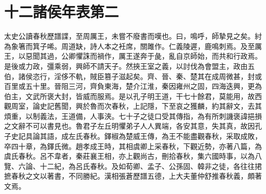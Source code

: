 \chapter{十二諸侯年表第二}

太史公讀春秋歷譜諜，至周厲王，未嘗不廢書而嘆也。曰，鳴呼，師摯見之矣。紂為象箸而箕子唏。周道缺，詩人本之衽席，關雎作。仁義陵遲，鹿鳴刺焉。及至厲王，以惡聞其過，公卿懼誅而禍作，厲王遂奔于彘，亂自京師始，而共和行政焉。是後或力政，彊乘弱，興師不請天子。然挾王室之義，以討伐為會盟主，政由五伯，諸侯恣行，淫侈不軌，賊臣篡子滋起矣。齊、晉、秦、楚其在成周微甚，封或百里或五十里。晉阻三河，齊負東海，楚介江淮，秦因雍州之固，四海迭興，更為伯主，文武所褒大封，皆威而服焉。是以孔子明王道，干七十餘君，莫能用，故西觀周室，論史記舊聞，興於魯而次春秋，上記隱，下至哀之獲麟，約其辭文，去其煩重，以制義法，王道備，人事浹。七十子之徒口受其傳指，為有所刺譏褒諱挹損之文辭不可以書見也。魯君子左丘明懼弟子人人異端，各安其意，失其真，故因孔子史記具論其語，成左氏春秋。鐸椒為楚威王傳，為王不能盡觀春秋，采取成敗，卒四十章，為鐸氏微。趙孝成王時，其相虞卿上采春秋，下觀近勢，亦著八篇，為虞氏春秋。呂不韋者，秦莊襄王相，亦上觀尚古，刪拾春秋，集六國時事，以為八覽、六論、十二紀，為呂氏春秋。及如荀卿、孟子、公孫固、韓非之徒，各往往捃摭春秋之文以著書，不同勝紀。漢相張蒼歷譜五德，上大夫董仲舒推春秋義，頗著文焉。

